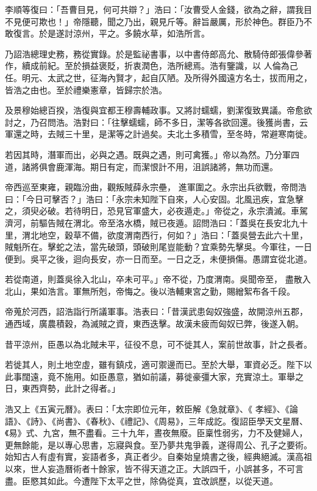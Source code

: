 \begin{pinyinscope}
 李順等復曰：「吾曹目見，何可共辯？」浩曰：「汝曹受人金錢，欲為之辭，謂我目不見便可欺也！」帝隱聽，聞之乃出，親見斤等。辭旨嚴厲，形於神色。群臣乃不敢復言。於是遂討涼州，平之。多饒水草，如浩所言。



 乃詔浩總理史務，務從實錄。於是監祕書事，以中書侍郎高允、散騎侍郎張偉參著作，續成前紀。至於損益褒貶，折衷潤色，浩所總焉。浩有鑒識，以
 人倫為己任。明元、太武之世，征海內賢才，起自仄陋。及所得外國遠方名士，拔而用之，皆浩之由也。至於禮樂憲章，皆歸宗於浩。



 及景穆始總百揆，浩復與宜都王穆壽輔政事。又將討蠕蠕，劉潔復致異議。帝愈欲討之，乃召問浩。浩對曰：「往擊蠕蠕，師不多日，潔等各欲回還。後獲尚書，云軍還之時，去賊三十里，是潔等之計過矣。夫北土多積雪，至冬時，常避寒南徙。



 若因其時，潛軍而出，必與之遇。既與之遇，則可禽獲。」帝以為然。乃分軍四道，諸將俱會鹿渾海。期日有定，而潔恨計不用，沮誤諸將，無功而還。



 帝西巡至東雍，親臨汾曲，觀叛賊薛永宗壘，
 進軍圍之。永宗出兵欲戰，帝問浩曰：「今日可擊否？」浩曰：「永宗未知陛下自來，人心安固。北風迅疾，宜急擊之，須臾必破。若待明日，恐見官軍盛大，必夜遁走。」帝從之，永宗潰滅。車駕濟河，前驅告賊在渭北。帝至洛水橋，賊已夜遁。詔問浩曰：「蓋吳在長安北九十里，渭北地空，穀草不備，欲度渭南西行，何如？」浩曰：「蓋吳營去此六十里，賊魁所在。擊蛇之法，當先破頭，頭破則尾豈能動？宜乘勢先擊吳。今軍往，一日便到。吳平之後，迴向長安，亦一日而至。一日之乏，未便損傷。愚謂宜從北道。



 若從南道，則蓋吳徐入北山，卒未可平。」帝不從，乃度渭南。吳聞帝至，
 盡散入北山，果如浩言。軍無所剋，帝悔之。後以浩輔東宮之勤，賜繒絮布各千段。



 帝蒐於河西，詔浩詣行所議軍事。浩表曰：「昔漢武患匈奴強盛，故開涼州五郡，通西域，廣農積穀，為滅賊之資，東西迭擊。故漢未疲而匈奴已弊，後遂入朝。



 昔平涼州，臣愚以為北賊未平，征役不息，可不徙其人，案前世故事，計之長者。



 若徙其人，則土地空虛，雖有鎮戍，適可禦邊而已。至於大舉，軍資必乏。陛下以此事闊遠，竟不施用。如臣愚意，猶如前議，募徙豪彊大家，充實涼土。軍舉之日，東西齊勢，此計之得者。」



 浩又上《五寅元曆》。表曰：「太宗即位元年，敕臣解《急就章》、《
 孝經》、《論語》、《詩》、《尚書》、《春秋》、《禮記》、《周易》，三年成訖。復詔臣學天文星曆、《易》式、九宮，無不盡看。三十九年，晝夜無廢。臣稟性弱劣，力不及健婦人，更無餘能，是以專心思書，忘寢與食。至乃夢共鬼爭義，遂得周公、孔子之要術。始知古人有虛有實，妄語者多，真正者少。自秦始皇燒書之後，經典絕滅。漢高祖以來，世人妄造曆術者十餘家，皆不得天道之正。大誤四千，小誤甚多，不可言盡。臣愍其如此。今遭陛下太平之世，除偽從真，宜改誤歷，以從天道。




\end{pinyinscope}
